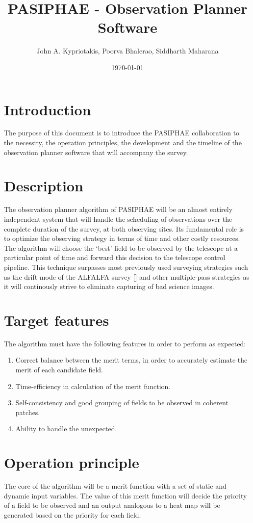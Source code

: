 \documentclass{article}
\title{PASIPHAE - Observation Planner Software}
\author{John A. Kypriotakis, Poorva Bhalerao, Siddharth Maharana}
\date{\today}
\begin{document}
\maketitle

\section{Introduction}
The purpose of this document is to introduce the PASIPHAE collaboration to the necessity, the operation principles, the development and the timeline of the observation planner software that will accompany the survey.

\section{Description}
The observation planner algorithm of PASIPHAE will be an almost entirely independent system that will handle the scheduling of observations over the complete duration of the survey, at both observing sites. Its fundamental role is to optimize the observing strategy in terms of time and other costly resources. The algorithm will choose the ‘best’ field to be observed by the telescope at a particular point of time and forward this decision to the telescope control pipeline. This technique surpasses most previously used surveying strategies such as the drift mode of the ALFALFA survey [\cite{Giovanelli2005}] and other multiple-pass strategies as it will continously strive to eliminate capturing of bad science images. 

\section{Target features}
The algorithm must have the following features in order to perform as expected:
\begin{enumerate}
\item Correct balance between the merit terms, in order to accurately estimate the merit of each candidate field.
\item Time-efficiency in calculation of the merit function.
\item Self-consistency and good grouping of fields to be observed in coherent patches.
\item Ability to handle the unexpected.
\end{enumerate}

\section{Operation principle}
The core of the algorithm will be a merit function with a set of static and dynamic input variables. The value of this merit function will decide the priority of a field to be observed and an output analogous to a heat map will be generated based on the priority for each field.
\end{document}
